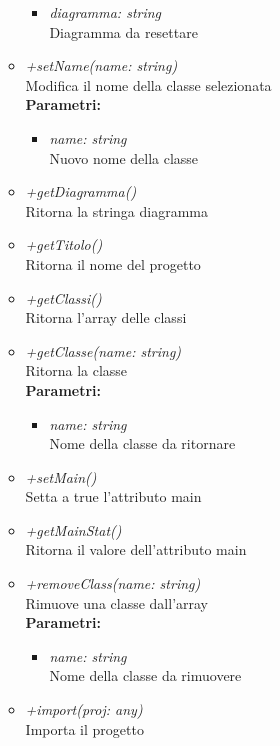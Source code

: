 \begin{itemize}
\begin{itemize}
\begin{itemize}
    			\item \emph{diagramma: string}\\
    			Diagramma da resettare
    		\end{itemize}
    		\item \emph{+setName(name: string)}\\
    		Modifica il nome della classe selezionata\\
    		\textbf{Parametri:}
    		\begin{itemize}
    			\item \emph{name: string}\\
    			Nuovo nome della classe
    		\end{itemize}
    		\item \emph{+getDiagramma()}\\
    		Ritorna la stringa diagramma
    		\item \emph{+getTitolo()}\\
    		Ritorna il nome del progetto
    		\item \emph{+getClassi()}\\
    		Ritorna l'array delle classi
    		\item \emph{+getClasse(name: string)}\\
    		Ritorna la classe\\
    		\textbf{Parametri:}
    		\begin{itemize}
    			\item \emph{name: string}\\
    			Nome della classe da ritornare
    		\end{itemize}
    		\item \emph{+setMain()}\\
    		Setta a true l'attributo main
    		\item \emph{+getMainStat()}\\
    		Ritorna il valore dell'attributo main
    		\item \emph{+removeClass(name: string)}\\
    		Rimuove una classe dall'array\\
    		\textbf{Parametri:}
    		\begin{itemize}
    			\item \emph{name: string}\\
    			Nome della classe da rimuovere
    		\end{itemize}
    		\item \emph{+import(proj: any)}\\
    		Importa il progetto\\

\end{itemize}
\end{itemize}
